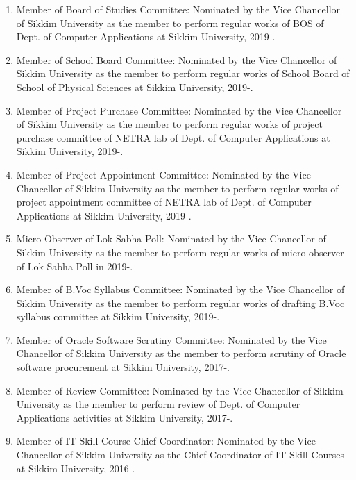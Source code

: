 \documentclass[11pt,a4paper]{moderncv}
\begin{document}
\begin{adjustwidth}{6em}{0pt}
\begin{enumerate}
		\item Member of Board of Studies Committee: Nominated by the Vice Chancellor of Sikkim University as the member to perform regular works of BOS of Dept. of Computer Applications at Sikkim University, 2019-.
		
		\item Member of School Board Committee: Nominated by the Vice Chancellor of Sikkim University as the member to perform regular works of School Board of School of Physical Sciences at Sikkim University, 2019-.
		
		\item Member of Project Purchase Committee: Nominated by the Vice Chancellor of Sikkim University as the member to perform regular works of project purchase committee of NETRA lab of Dept. of Computer Applications at Sikkim University, 2019-.
		
		\item Member of Project Appointment Committee: Nominated by the Vice Chancellor of Sikkim University as the member to perform regular works of project appointment committee of NETRA lab of Dept. of Computer Applications at Sikkim University, 2019-.
		
		\item Micro-Observer of Lok Sabha Poll: Nominated by the Vice Chancellor of Sikkim University as the member to perform regular works of micro-observer of Lok Sabha Poll in 2019-.
		
		\item Member of B.Voc Syllabus Committee: Nominated by the Vice Chancellor of Sikkim University as the member to perform regular works of drafting B.Voc syllabus committee at Sikkim University, 2019-.
		
		\item Member of Oracle Software Scrutiny Committee: Nominated by the Vice Chancellor of Sikkim University as the member to perform scrutiny of Oracle software procurement at Sikkim University, 2017-.
		
		\item Member of Review Committee: Nominated by the Vice Chancellor of Sikkim University as the member to perform review of Dept. of Computer Applications activities at Sikkim University, 2017-.
		
		\item Member of IT Skill Course Chief Coordinator: Nominated by the Vice Chancellor of Sikkim University as the Chief Coordinator of IT Skill Courses at Sikkim University, 2016-.
		

\end{enumerate}
\end{adjustwidth}
\end{document}
